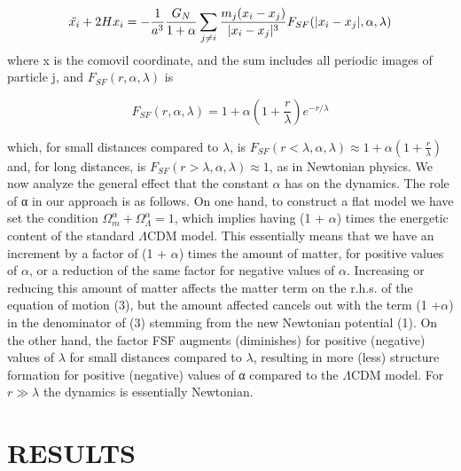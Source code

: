 \documentclass[10pt,journal]{IEEEtran}
\begin{document}
\begin{equation}
    \Ddot{x_i}+2Hx_i=-\frac{1}{a^3}\frac{G_N}{1+\alpha}\sum_{j\neq i}\frac{m_j(x_i-x_j)}{|x_i-x_j|^3}F_{SF}(|x_i-x_j|,\alpha,\lambda)
\end{equation}
where x is the comovil coordinate, and the sum includes
all periodic images of particle j, and $F_{SF}(r,\alpha,\lambda)$ is

\begin{equation}
    F_{SF}(r,\alpha,\lambda)=1+\alpha \left(1+\frac{r}{\lambda} \right) e^{-r/\lambda} 
\end{equation}

which, for small distances compared to $\lambda$, is $F_{SF} (r <
\lambda, \alpha, \lambda) \approx 1 + \alpha (1+\frac{r}{\lambda})$
and, for long distances, is
$F_{SF} (r > \lambda, \alpha, \lambda) \approx 1$, as in Newtonian physics. \newline
We now analyze the general effect that the constant
$\alpha$ has on the dynamics. The role of α in our approach
is as follows. On one hand, to construct a flat model
we have set the condition $\Omega_{m}^{\alpha}+\Omega_{\Lambda}^{\alpha}=1 $, which implies
having (1 + $\alpha$) times the energetic content of the standard $\Lambda$CDM model. This essentially means that we have
an increment by a factor of (1 + $\alpha$) times the amount
of matter, for positive values of $\alpha$, or a reduction of the
same factor for negative values of $\alpha$. Increasing or reducing this amount of matter affects the matter term on
the r.h.s. of the equation of motion (3), but the amount
affected cancels out with the term (1 +$\alpha$) in the denominator of (3) stemming from the new Newtonian potential
(1). On the other hand, the factor FSF augments (diminishes) for positive (negative) values of $\lambda$ for small distances compared to $\lambda$, resulting in more (less) structure
formation for positive (negative) values of α compared to
the $\Lambda$CDM model. For $r\gg \lambda$ the dynamics is essentially
Newtonian.
\section{RESULTS}
\end{document}
